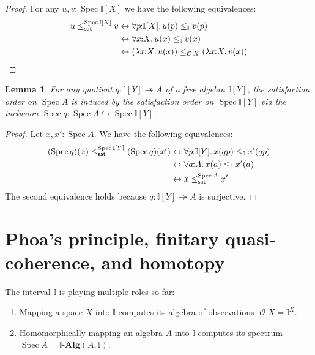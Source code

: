\documentclass[a4paper,12pt]{amsart}
\newtheorem{lemma}[theorem]{Lemma}
\newtheorem{corollary}[theorem]{Corollary}
\theoremstyle{definition}
\newcommand{\mc}[1]{\mathcal{#1}}
\newcommand{\mb}[1]{\mathbf{#1}}
\newcommand{\mbb}[1]{\mathbb{#1}}
\newcommand{\I}{\mbb I}
\newcommand{\alg}{\text{-}\mb{Alg}}
\newcommand{\surj}{\twoheadrightarrow}
\newcommand{\hook}{\hookrightarrow}
\newcommand{\fa}[2]{\forall #1\!\colon\!\!#2\mathpunct{.}}
\newcommand{\ld}[2]{\lambda #1\!\colon\!\!#2\mathpunct{.}}
\newcommand{\eq}{\leftrightarrow}
\newcommand{\spec}{\operatorname{Spec}}
\newcommand{\opens}{\operatorname{\mc{O}}} %
\begin{document}
\begin{proof}
  For any $u,v:\spec{\I[X]}$ we have the following equivalences:
  \begin{align*}
    u \satle[\spec{\I[X]}] v
    &\eq \fa{p}{\I[X]} u(p) \le_{\I} v(p)
    \\ 
    &\eq \fa{x}{X} u(x) \le_{\I} v(x)
    \\ 
    &\eq (\ld{x}{X}u(x)) \le_{\opens{X}} (\ld{x}{X}v(x))
    \qedhere
  \end{align*}
\end{proof}


\begin{lemma}\label{lem:cancoincide}
  For any quotient $q \colon \I[Y] \surj A$ of a free algebra $\I[Y]$, the satisfaction order on $\spec A$ is induced by the satisfaction order on $\spec{\I[Y]}$ via the inclusion ${\spec{q}}\colon\spec{A}\hook \spec{\I[Y]}$.
\end{lemma} 

\begin{proof}
  Let $x,x' : \spec A$. We have the following equivalences:
  \begin{align*}
    (\spec{q})(x)\satle[\spec{\I[Y]}] (\spec{q})(x')
    &\eq 
    \fa{p}{\I[Y]}
    x(qp) \le_\I x'(qp)
    \\ 
    &\eq 
    \fa{a}{A} x(a) \le_\I x'(a) 
    \\ 
    &\eq 
    x\satle[\spec{A}] x'
  \end{align*}
% 
  The second equivalence holds because $q\colon \I[Y]\surj A$ is surjective.
\end{proof}



\section{Phoa's principle, finitary quasi-coherence, and homotopy}

The interval $\I$ is playing multiple roles so far:
\begin{enumerate}
  \item Mapping a space $X$ into $\I$ computes its algebra of observations $\opens{X} = \I^X$.
  \item Homomorphically mapping an algebra $A$ into $\I$ computes its spectrum $\spec{A} = \I\alg(A,\I)$.
\end{enumerate}
\end{document}
